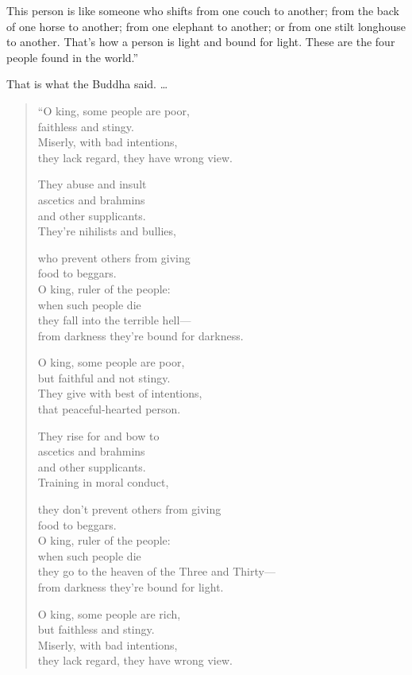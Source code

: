 \documentclass[12pt,openany]{book}%
\begin{document}
This person is like someone who shifts from one couch to another; from the back of one horse to another; from one elephant to another; or from one stilt longhouse to another. That’s how a person is light and bound for light. These are the four people found in the world.” 

That is what the Buddha said. … 

\begin{verse}%
“O king, some people are poor, \\
faithless and stingy. \\
Miserly, with bad intentions, \\
they lack regard, they have wrong view. 

They abuse and insult \\
ascetics and brahmins \\
and other supplicants. \\
They’re nihilists and bullies, 

who prevent others from giving \\
food to beggars. \\
O king, ruler of the people: \\
when such people die \\
they fall into the terrible hell—\\
from darkness they’re bound for darkness. 

O king, some people are poor, \\
but faithful and not stingy. \\
They give with best of intentions, \\
that peaceful-hearted person. 

They rise for and bow to \\
ascetics and brahmins \\
and other supplicants. \\
Training in moral conduct, 

they don’t prevent others from giving \\
food to beggars. \\
O king, ruler of the people: \\
when such people die \\
they go to the heaven of the Three and Thirty—\\
from darkness they’re bound for light. 

O king, some people are rich, \\
but faithless and stingy. \\
Miserly, with bad intentions, \\
they lack regard, they have wrong view. 


\end{verse}
\end{document}
